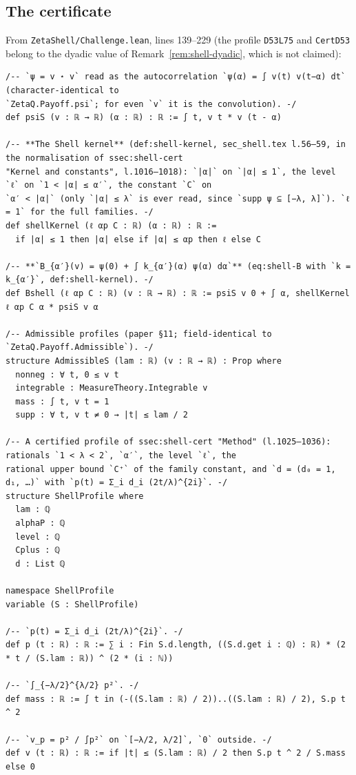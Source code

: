 \subsection{The certificate}
From \texttt{ZetaShell/Challenge.lean}, lines 139--229 (the profile \texttt{D53L75} and \texttt{CertD53} belong to the dyadic value of Remark~\ref{rem:shell-dyadic}, which is not
claimed):
\begin{Verbatim}[fontsize=\footnotesize,breaklines,frame=single,framesep=2mm]
/-- `ψ = v ⋆ v` read as the autocorrelation `ψ(α) = ∫ v(t) v(t−α) dt` (character-identical to
`ZetaQ.Payoff.psi`; for even `v` it is the convolution). -/
def psiS (v : ℝ → ℝ) (α : ℝ) : ℝ := ∫ t, v t * v (t - α)

/-- **The Shell kernel** (def:shell-kernel, sec_shell.tex l.56–59, in the normalisation of ssec:shell-cert
"Kernel and constants", l.1016–1018): `|α|` on `|α| ≤ 1`, the level `ℓ` on `1 < |α| ≤ α′`, the constant `C` on
`α′ < |α|` (only `|α| ≤ λ` is ever read, since `supp ψ ⊆ [−λ, λ]`). `ℓ = 1` for the full families. -/
def shellKernel (ℓ αp C : ℝ) (α : ℝ) : ℝ :=
  if |α| ≤ 1 then |α| else if |α| ≤ αp then ℓ else C

/-- **`B_{α′}(v) = ψ(0) + ∫ k_{α′}(α) ψ(α) dα`** (eq:shell-B with `k = k_{α′}`, def:shell-kernel). -/
def Bshell (ℓ αp C : ℝ) (v : ℝ → ℝ) : ℝ := psiS v 0 + ∫ α, shellKernel ℓ αp C α * psiS v α

/-- Admissible profiles (paper §11; field-identical to `ZetaQ.Payoff.Admissible`). -/
structure AdmissibleS (lam : ℝ) (v : ℝ → ℝ) : Prop where
  nonneg : ∀ t, 0 ≤ v t
  integrable : MeasureTheory.Integrable v
  mass : ∫ t, v t = 1
  supp : ∀ t, v t ≠ 0 → |t| ≤ lam / 2

/-- A certified profile of ssec:shell-cert "Method" (l.1025–1036): rationals `1 < λ < 2`, `α′`, the level `ℓ`, the
rational upper bound `C⁺` of the family constant, and `d = (d₀ = 1, d₁, …)` with `p(t) = Σ_i d_i (2t/λ)^{2i}`. -/
structure ShellProfile where
  lam : ℚ
  alphaP : ℚ
  level : ℚ
  Cplus : ℚ
  d : List ℚ

namespace ShellProfile
variable (S : ShellProfile)

/-- `p(t) = Σ_i d_i (2t/λ)^{2i}`. -/
def p (t : ℝ) : ℝ := ∑ i : Fin S.d.length, ((S.d.get i : ℚ) : ℝ) * (2 * t / (S.lam : ℝ)) ^ (2 * (i : ℕ))

/-- `∫_{−λ/2}^{λ/2} p²`. -/
def mass : ℝ := ∫ t in (-((S.lam : ℝ) / 2))..((S.lam : ℝ) / 2), S.p t ^ 2

/-- `v_p = p² / ∫p²` on `[−λ/2, λ/2]`, `0` outside. -/
def v (t : ℝ) : ℝ := if |t| ≤ (S.lam : ℝ) / 2 then S.p t ^ 2 / S.mass else 0


\end{Verbatim}
